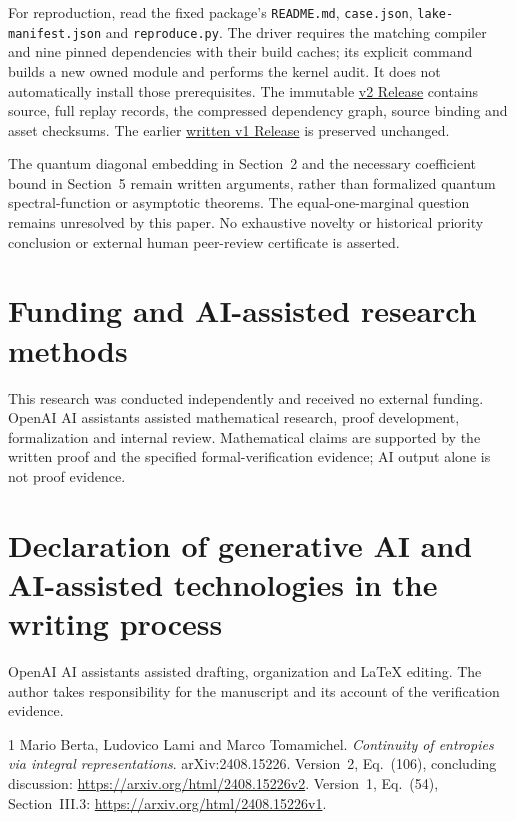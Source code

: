 \documentclass[11pt,a4paper]{article}
\begin{document}
For reproduction, read the fixed package's \texttt{README.md},
\texttt{case.json}, \texttt{lake-manifest.json} and \texttt{reproduce.py}.
The driver requires the matching compiler and nine pinned dependencies
with their build caches; its explicit command builds a new owned module
and performs the kernel audit. It does not automatically install those
prerequisites. The immutable
\href{https://github.com/mxym/math/releases/tag/mutual-information-continuity-counterexample-v2-lean}{v2 Release}
contains source, full replay records, the compressed dependency graph,
source binding and asset checksums. The earlier
\href{https://github.com/mxym/math/releases/tag/mutual-information-continuity-counterexample-v1}{written v1 Release}
is preserved unchanged.

The quantum diagonal embedding in Section~2 and the necessary coefficient
bound in Section~5 remain written arguments, rather than formalized quantum
spectral-function or asymptotic theorems. The equal-one-marginal question
remains unresolved by this paper. No exhaustive novelty or historical
priority conclusion or external human peer-review certificate is asserted.

\section*{Funding and AI-assisted research methods}
This research was conducted independently and received no external funding.
OpenAI AI assistants assisted mathematical research, proof development,
formalization and internal review. Mathematical claims are supported by
the written proof and the specified formal-verification evidence; AI output
alone is not proof evidence.

\section*{Declaration of generative AI and AI-assisted technologies
in the writing process}
OpenAI AI assistants assisted drafting, organization and LaTeX editing.
The author takes responsibility for the manuscript and its account of the
verification evidence.

\begin{thebibliography}{1}
 Mario Berta, Ludovico Lami and Marco Tomamichel.
\emph{Continuity of entropies via integral representations}.
arXiv:2408.15226. Version~2, Eq.~(106), concluding discussion:
\url{https://arxiv.org/html/2408.15226v2}.
Version~1, Eq.~(54), Section~III.3:
\url{https://arxiv.org/html/2408.15226v1}.
\end{thebibliography}
\end{document}
